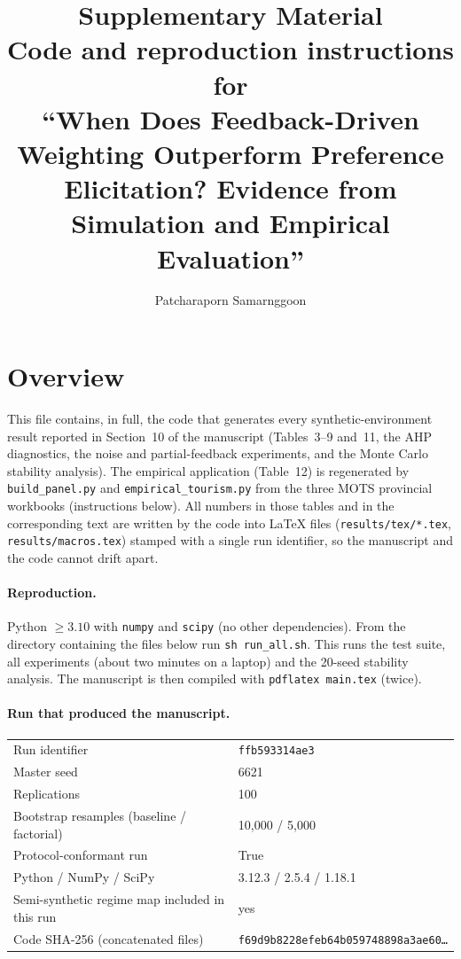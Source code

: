\documentclass[10pt,a4paper]{article}
\title{Supplementary Material\\ \large Code and reproduction instructions for\\
``When Does Feedback-Driven Weighting Outperform Preference Elicitation? Evidence from Simulation and Empirical Evaluation''}
\author{Patcharaporn Samarnggoon}
\date{}
\begin{document}
\maketitle
\section{Overview}
This file contains, in full, the code that generates every synthetic-environment result reported in Section~10 of the
manuscript (Tables~3--9 and~11, the AHP diagnostics, the noise and partial-feedback experiments, and the Monte Carlo
stability analysis). The empirical application (Table~12) is regenerated by \texttt{build\_panel.py} and \texttt{empirical\_tourism.py} from the three MOTS provincial workbooks (instructions below). All numbers in those tables and in the corresponding text are written by the code into LaTeX files
(\texttt{results/tex/*.tex}, \texttt{results/macros.tex}) stamped with a single run identifier, so the manuscript and the code
cannot drift apart.

\paragraph{Reproduction.} Python $\ge 3.10$ with \texttt{numpy} and \texttt{scipy} (no other dependencies). From the
directory containing the files below run \texttt{sh run\_all.sh}. This runs the test suite, all experiments (about two minutes
on a laptop) and the 20-seed stability analysis. The manuscript is then compiled with \texttt{pdflatex main.tex} (twice).

\paragraph{Run that produced the manuscript.}
\begin{tabular}{ll}
Run identifier & \texttt{ffb593314ae3}\\
Master seed & 6621\\
Replications & 100\\
Bootstrap resamples (baseline / factorial) & 10{,}000 / 5{,}000\\
Protocol-conformant run & True\\
Python / NumPy / SciPy & 3.12.3 / 2.5.4 / 1.18.1\\
Semi-synthetic regime map included in this run & yes\\
Code SHA-256 (concatenated files) & \texttt{f69d9b8228efeb64b059748898a3ae60\ldots}\\
\end{tabular}
\end{document}
